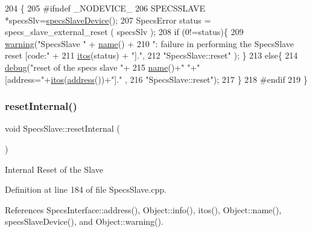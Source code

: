 \begin{DoxyCode}
204                       \{
205 \textcolor{preprocessor}{#ifndef \_NODEVICE\_
}
206   SPECSSLAVE *specsSlv=\hyperlink{classSpecsSlave_a44970aca61b6fdcd6d6d90e6601093f3}{specsSlaveDevice}();
207   SpecsError status = specs\_slave\_external\_reset ( specsSlv );
208   \textcolor{keywordflow}{if} (0!=status)\{
209     \hyperlink{classObject_a65cd4fda577711660821fd2cd5a3b4c9}{warning}(\textcolor{stringliteral}{"SpecsSlave "} + \hyperlink{classObject_a300f4c05dd468c7bb8b3c968868443c1}{name}() +
210             \textcolor{stringliteral}{": failure in performing the SpecsSlave reset [code:"} +
211             \hyperlink{Tools_8h_af330027dbdafb9a30768b3613c553e60}{itos}(status) + \textcolor{stringliteral}{"]."},
212             \textcolor{stringliteral}{"SpecsSlave::reset"} );   \}
213   \textcolor{keywordflow}{else}\{
214     \hyperlink{classObject_aac010553f022165573714b7014a15f0d}{debug}(\textcolor{stringliteral}{"reset of the specs slave "}+
215           \hyperlink{classObject_a300f4c05dd468c7bb8b3c968868443c1}{name}()+\textcolor{stringliteral}{" "}+\textcolor{stringliteral}{" [address="}+\hyperlink{Tools_8h_af330027dbdafb9a30768b3613c553e60}{itos}(\hyperlink{classSpecsInterface_a0fa039a15b842a5ba783ce825b9915d8}{address}())+\textcolor{stringliteral}{"]."} ,
216           \textcolor{stringliteral}{"SpecsSlave::reset"});
217   \}
218 \textcolor{preprocessor}{#endif
}
219 \}
\end{DoxyCode}
\mbox{\label{classSpecsSlave_aa4f2493eabe522bb6651abcd67a6a690}} 
\subsubsection{\texorpdfstring{reset\+Internal()}{resetInternal()}}
{\footnotesize\ttfamily void Specs\+Slave\+::reset\+Internal (\begin{DoxyParamCaption}{ }\end{DoxyParamCaption})}

Internal Reset of the Slave 

Definition at line 184 of file Specs\+Slave.\+cpp.



References Specs\+Interface\+::address(), Object\+::info(), itos(), Object\+::name(), specs\+Slave\+Device(), and Object\+::warning().



